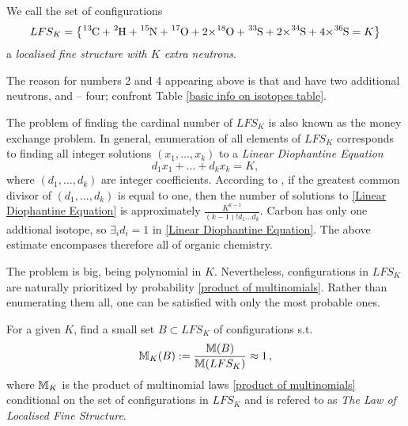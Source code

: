 \begin{mydef}\label{localised fine structure definition}
	We call the set of configurations  
	{\small
		\begin{equation}\label{LFS_K}
			LFS_K	=
			\left\{ 
				\cem{^{13}C} + \cem{^{2}H} +  \cem{^{15}N} +  \cem{^{17}O} +  \cem{2 $\times$^{18}O} +  \cem{^{33}S} +  \cem{2 $\times$^{34}S} + \cem{4 $\times$^{36}S} = K	
			\right\}
		\end{equation}
	}
	a \emph{localised fine structure with $K$ extra neutrons}.  	
\end{mydef}

The reason for numbers 2 and 4 appearing above is that  and  have two additional neutrons, and  -- four; confront Table \ref{basic info on isotopes table}.

The problem of finding the cardinal number of $LFS_K$ is also known as the money exchange problem. In general, enumeration of all elements of $LFS_K$ corresponds to finding all integer solutions $(x_1, \dots, x_k)$ to a {\it Linear Diophantine Equation}  
\begin{equation}\label{Linear Diophantine Equation}
	d_1 x_1 + \dots + d_k x_k = K,
\end{equation}
where $(d_1, \dots, d_k)$ are integer coefficients. According to \cite{Agnarsson2002OnTheSylvesterDenumerants}, if the greatest common divisor of $(d_1, \dots, d_k)$ is equal to one, then the number of solutions to \eqref{Linear Diophantine Equation} is approximately $\frac{K^{k-1}}{(k-1)! d_1 \dots d_k}$. Carbon has only one addtional isotope, so $\exists_i d_i = 1$ in \eqref{Linear Diophantine Equation}. The above estimate encompases therefore all of organic chemistry. 

The problem is big, being polynomial in $K$. Nevertheless, configurations in $LFS_K$ are naturally prioritized by probability \eqref{product of multinomials}. Rather than enumerating them all, one can be satisfied with only the most probable ones. 


\begin{Problem}\label{Problem of finding LFS_K configurations.}
	For a given $K$, find a small set $B \subset LFS_K$ of configurations s.t. 
	\begin{equation}\label{problem equation}
		\mathbb{M}_K (B) := \frac{ \mathbb{M}(B) }{ \mathbb{M}( LFS_K ) } \approx 1\,,	
	\end{equation} 
	where $\mathbb{M}_K$ is the product of multinomial laws \eqref{product of multinomials} conditional on the set of configurations in $LFS_K$ and is refered to as \emph{The Law of Localised Fine Structure}.
\end{Problem}


